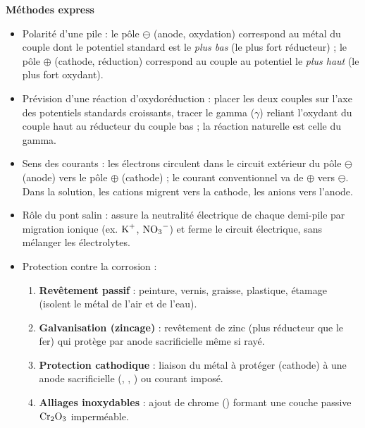 \documentclass[11pt]{article}
\newcommand{\cle}[1]{{\popxbold\color{popdark}#1}}
\begin{document}
\begin{aretenir}
\textbf{Méthodes express}
\begin{itemize}
  \item \cle{Polarité d'une pile} : le pôle $\ominus$ (anode, oxydation) correspond au métal du couple dont le potentiel standard est le \emph{plus bas} (le plus fort réducteur) ; le pôle $\oplus$ (cathode, réduction) correspond au couple au potentiel le \emph{plus haut} (le plus fort oxydant).
  \item \cle{Prévision d'une réaction d'oxydoréduction} : placer les deux couples sur l'axe des potentiels standards croissants, tracer le \cle{gamma ($\gamma$)} reliant l'oxydant du couple haut au réducteur du couple bas ; la réaction naturelle est celle du gamma.
  \item \cle{Sens des courants} : les électrons circulent dans le circuit extérieur du pôle $\ominus$ (anode) vers le pôle $\oplus$ (cathode) ; le courant conventionnel va de $\oplus$ vers $\ominus$. Dans la solution, les cations migrent vers la cathode, les anions vers l'anode.
  \item \cle{Rôle du pont salin} : assure la neutralité électrique de chaque demi-pile par migration ionique (ex. $\ce{K+}$, $\ce{NO3-}$) et ferme le circuit électrique, sans mélanger les électrolytes.
  \item \cle{Protection contre la corrosion} : 
  \begin{enumerate}
    \item \textbf{Revêtement passif} : peinture, vernis, graisse, plastique, étamage (isolent le métal de l'air et de l'eau).
    \item \textbf{Galvanisation (zincage)} : revêtement de zinc (plus réducteur que le fer) qui protège par anode sacrificielle même si rayé.
    \item \textbf{Protection cathodique} : liaison du métal à protéger (cathode) à une anode sacrificielle (, , ) ou courant imposé.
    \item \textbf{Alliages inoxydables} : ajout de chrome () formant une couche passive $\ce{Cr2O3}$ imperméable.
  \end{enumerate}
\end{itemize}
\end{aretenir}
\end{document}
